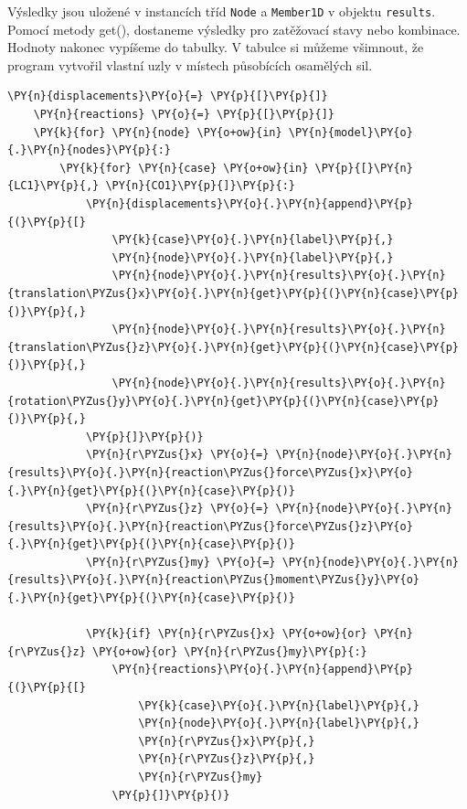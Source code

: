 Výsledky jsou uložené v instancích tříd \texttt{Node} a \texttt{Member1D} v objektu \texttt{results}. Pomocí metody {get()}, dostaneme výsledky pro zatěžovací stavy nebo kombinace. Hodnoty nakonec vypíšeme do tabulky. V tabulce si můžeme všimnout, že program vytvořil vlastní uzly v místech působících osamělých sil.
\begin{tcolorbox}[breakable, size=fbox, boxrule=1pt, pad at break*=1mm,colback=cellbackground, colframe=cellborder]
    \begin{Verbatim}[commandchars=\\\{\}]
    \PY{n}{displacements}\PY{o}{=} \PY{p}{[}\PY{p}{]}
    \PY{n}{reactions} \PY{o}{=} \PY{p}{[}\PY{p}{]}
    \PY{k}{for} \PY{n}{node} \PY{o+ow}{in} \PY{n}{model}\PY{o}{.}\PY{n}{nodes}\PY{p}{:}
        \PY{k}{for} \PY{n}{case} \PY{o+ow}{in} \PY{p}{[}\PY{n}{LC1}\PY{p}{,} \PY{n}{CO1}\PY{p}{]}\PY{p}{:}
            \PY{n}{displacements}\PY{o}{.}\PY{n}{append}\PY{p}{(}\PY{p}{[}
                \PY{k}{case}\PY{o}{.}\PY{n}{label}\PY{p}{,}
                \PY{n}{node}\PY{o}{.}\PY{n}{label}\PY{p}{,}
                \PY{n}{node}\PY{o}{.}\PY{n}{results}\PY{o}{.}\PY{n}{translation\PYZus{}x}\PY{o}{.}\PY{n}{get}\PY{p}{(}\PY{n}{case}\PY{p}{)}\PY{p}{,}
                \PY{n}{node}\PY{o}{.}\PY{n}{results}\PY{o}{.}\PY{n}{translation\PYZus{}z}\PY{o}{.}\PY{n}{get}\PY{p}{(}\PY{n}{case}\PY{p}{)}\PY{p}{,}
                \PY{n}{node}\PY{o}{.}\PY{n}{results}\PY{o}{.}\PY{n}{rotation\PYZus{}y}\PY{o}{.}\PY{n}{get}\PY{p}{(}\PY{n}{case}\PY{p}{)}\PY{p}{,}
            \PY{p}{]}\PY{p}{)}
            \PY{n}{r\PYZus{}x} \PY{o}{=} \PY{n}{node}\PY{o}{.}\PY{n}{results}\PY{o}{.}\PY{n}{reaction\PYZus{}force\PYZus{}x}\PY{o}{.}\PY{n}{get}\PY{p}{(}\PY{n}{case}\PY{p}{)}
            \PY{n}{r\PYZus{}z} \PY{o}{=} \PY{n}{node}\PY{o}{.}\PY{n}{results}\PY{o}{.}\PY{n}{reaction\PYZus{}force\PYZus{}z}\PY{o}{.}\PY{n}{get}\PY{p}{(}\PY{n}{case}\PY{p}{)}
            \PY{n}{r\PYZus{}my} \PY{o}{=} \PY{n}{node}\PY{o}{.}\PY{n}{results}\PY{o}{.}\PY{n}{reaction\PYZus{}moment\PYZus{}y}\PY{o}{.}\PY{n}{get}\PY{p}{(}\PY{n}{case}\PY{p}{)}
    
            \PY{k}{if} \PY{n}{r\PYZus{}x} \PY{o+ow}{or} \PY{n}{r\PYZus{}z} \PY{o+ow}{or} \PY{n}{r\PYZus{}my}\PY{p}{:}
                \PY{n}{reactions}\PY{o}{.}\PY{n}{append}\PY{p}{(}\PY{p}{[}
                    \PY{k}{case}\PY{o}{.}\PY{n}{label}\PY{p}{,}
                    \PY{n}{node}\PY{o}{.}\PY{n}{label}\PY{p}{,}
                    \PY{n}{r\PYZus{}x}\PY{p}{,}
                    \PY{n}{r\PYZus{}z}\PY{p}{,}
                    \PY{n}{r\PYZus{}my}
                \PY{p}{]}\PY{p}{)}
            

\end{Verbatim}
\end{tcolorbox}
